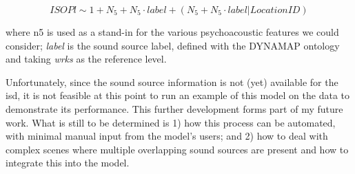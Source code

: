 \begin{equation}
  \label{eqn:integSource}
      ISOPl \sim 1 + N_5 + N_5 \cdot label + (N_5 + N_5 \cdot label | LocationID)
  \end{equation}

where \gls{n5} is used as a stand-in for the various psychoacoustic features we could consider; \emph{label} is the sound source label, defined with the DYNAMAP ontology and taking \emph{wrks} as the reference level.



Unfortunately, since the sound source information is not (yet) available for the \gls{isd}, it is not feasible at this point to run an example of this model on the data to demonstrate its performance. This further development forms part of my future work.  What is still to be determined is 1) how this process can be automated, with minimal manual input from the model's users; and 2) how to deal with complex scenes where multiple overlapping sound sources are present and how to integrate this into the model.

